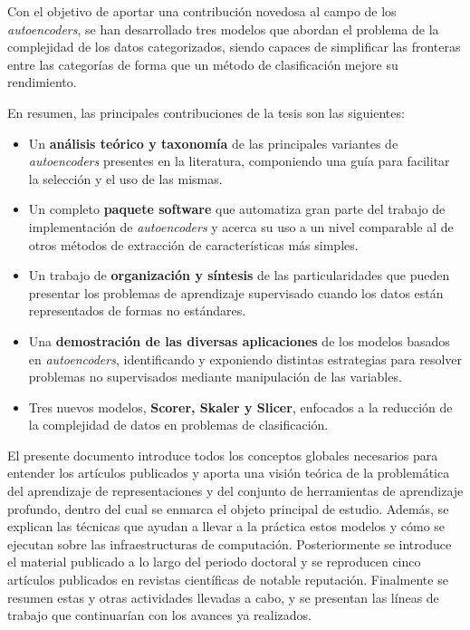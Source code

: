 Con el objetivo de aportar una contribución novedosa al campo de los \textit{autoencoders}, se han desarrollado tres modelos que abordan el problema de la complejidad de los datos categorizados, siendo capaces de simplificar las fronteras entre las categorías de forma que un método de clasificación mejore su rendimiento.

En resumen, las principales contribuciones de la tesis son las siguientes:

\begin{itemize}
    \item Un \textbf{análisis teórico y taxonomía} de las principales variantes de \textit{autoencoders} presentes en la literatura, componiendo una guía para facilitar la selección y el uso de las mismas.
    \item Un completo \textbf{paquete software} que automatiza gran parte del trabajo de implementación de \textit{autoencoders} y acerca su uso a un nivel comparable al de otros métodos de extracción de características más simples.
    \item Un trabajo de \textbf{organización y síntesis} de las particularidades que pueden presentar los problemas de aprendizaje supervisado cuando los datos están representados de formas no estándares.
    \item Una \textbf{demostración de las diversas aplicaciones} de los modelos basados en \textit{autoencoders}, identificando y exponiendo distintas estrategias para resolver problemas no supervisados mediante manipulación de las variables.
    \item Tres nuevos modelos, \textbf{Scorer, Skaler y Slicer}, enfocados a la reducción de la complejidad de datos en problemas de clasificación.
\end{itemize}

El presente documento introduce todos los conceptos globales necesarios para entender los artículos publicados y aporta una visión teórica de la problemática del aprendizaje de representaciones y del conjunto de herramientas de aprendizaje profundo, dentro del cual se enmarca el objeto principal de estudio. Además, se explican las técnicas que ayudan a llevar a la práctica estos modelos y cómo se ejecutan sobre las infraestructuras de computación. Posteriormente se introduce el material publicado a lo largo del periodo doctoral y se reproducen cinco artículos publicados en revistas científicas de notable reputación. Finalmente se resumen estas y otras actividades llevadas a cabo, y se presentan las líneas de trabajo que continuarían con los avances ya realizados.



%